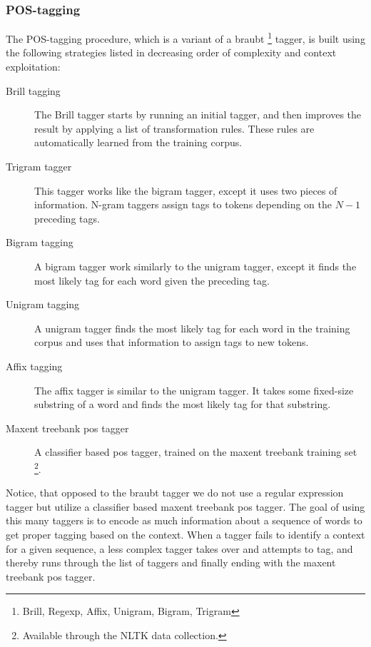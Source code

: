 \documentclass[10pt,letterpaper,final]{article}
\begin{document}
\subsubsection{POS-tagging}
The POS-tagging procedure, which is a variant of a braubt
\footnote{Brill, Regexp, Affix, Unigram, Bigram, Trigram} tagger, is
built using the following strategies listed in decreasing order of
complexity and context exploitation:
\begin{description}
\item[Brill tagging] The Brill \cite{Brill:1992:SRP:974499.974526}
tagger starts by running an initial tagger, and then improves the result
by applying a list of transformation rules. These rules are
automatically learned from the training corpus.
\item[Trigram tagger] This tagger works like the bigram tagger, except it
uses two pieces of information. N-gram taggers assign tags to tokens
depending on the $N - 1$ preceding tags.
\item[Bigram tagging] A bigram tagger work similarly to the unigram
tagger, except it finds the most likely tag for each word given the
preceding tag.
\item[Unigram tagging] A unigram tagger finds the most likely tag for each word
in the training corpus and uses that information to assign tags to new
tokens.
\item[Affix tagging] The affix tagger is similar to the unigram tagger.
It takes some fixed-size substring of a word and finds the most likely
tag for that substring.
\item[Maxent treebank pos tagger] A classifier based pos tagger, trained
on the maxent treebank training set \footnote{Available through the NLTK
data collection.}.
\end{description}
Notice, that opposed to the
braubt tagger we do not use a regular expression tagger but utilize a
classifier based maxent treebank pos tagger. The goal of using this many
taggers is to encode as much information about a sequence of words to
get proper tagging based on the context. When a tagger fails to identify
a context for a given sequence, a less complex tagger takes over and
attempts to tag, and thereby runs through the list of taggers and
finally ending with the maxent treebank pos tagger.

\end{document}
